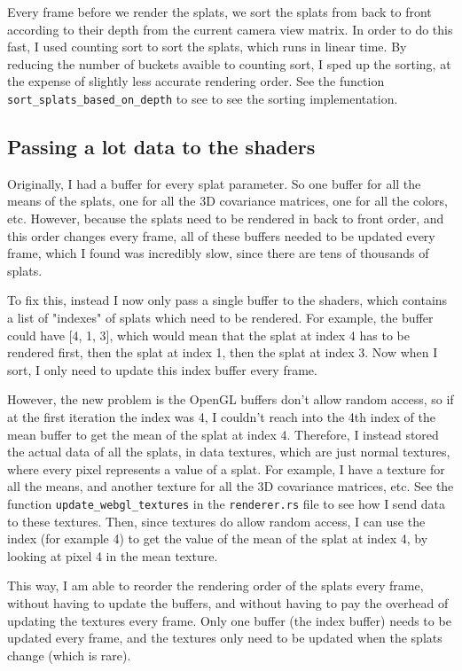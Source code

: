 \documentclass {article}
\begin{document}
     Every frame before we render the splats, we sort the splats from back to front according to their depth from the current camera view matrix. In order to do this fast, I used counting sort to sort the splats, which runs in linear time. By reducing the number of buckets avaible to counting sort, I sped up the sorting, at the expense of slightly less accurate rendering order. See the function \lstinline[style=inlinecode]{sort_splats_based_on_depth} to see to see the sorting implementation.

     \subsection{Passing a lot data to the shaders}

     Originally, I had a buffer for every splat parameter. So one buffer for all the means of the splats, one for all the 3D covariance matrices, one for all the colors, etc. However, because the splats need to be rendered in back to front order, and this order changes every frame, all of these buffers needed to be updated every frame, which I found was incredibly slow, since there are tens of thousands of splats.
     
     To fix this, instead I now only pass a single buffer to the shaders, which contains a list of "indexes" of splats which need to be rendered. For example, the buffer could have [4, 1, 3], which would mean that the splat at index 4 has to be rendered first, then the splat at index 1, then the splat at index 3. Now when I sort, I only need to update this index buffer every frame.

     However, the new problem is the OpenGL buffers don't allow random access, so if at the first iteration the index was 4, I couldn't reach into the 4th index of the mean buffer to get the mean of the splat at index 4. Therefore, I instead stored the actual data of all the splats, in data textures, which are just normal textures, where every pixel represents a value of a splat. For example, I have a texture for all the means, and another texture for all the 3D covariance matrices, etc. See the function \lstinline[style=inlinecode]{update_webgl_textures} in the \lstinline[style=inlinecode]{renderer.rs} file to see how I send data to these textures. Then, since textures do allow random access, I can use the index (for example 4) to get the value of the mean of the splat at index 4, by looking at pixel 4 in the mean texture. 

     This way, I am able to reorder the rendering order of the splats every frame, without having to update the buffers, and without having to pay the overhead of updating the textures every frame. Only one buffer (the index buffer) needs to be updated every frame, and the textures only need to be updated when the splats change (which is rare).
\end{document}
